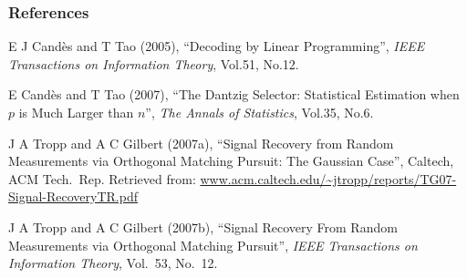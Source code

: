 \documentclass{beamer}
\newcounter{countRef}
\newcommand{\I}{\item}
\begin{document}
\begin{frame}
\frametitle{References}
\begin{enumerate}
\setcounter{enumi}{\value{countRef}} { \small
\I E J Cand\`es and T Tao (2005), ``Decoding by Linear Programming'', \textit{IEEE Transactions on Information Theory}, Vol.51, No.12.
\I E Cand\`es and T Tao (2007), ``The Dantzig Selector: Statistical Estimation when \(p\) is Much Larger than \(n\)'', \textit{The Annals of Statistics}, Vol.35, No.6.
\I J A Tropp and A C Gilbert (2007a), ``Signal Recovery from Random Measurements via Orthogonal Matching Pursuit: The Gaussian Case'', Caltech, ACM Tech.\ Rep. Retrieved from: \url{www.acm.caltech.edu/~jtropp/reports/TG07-Signal-RecoveryTR.pdf}
\I J A Tropp and A C Gilbert (2007b), ``Signal Recovery From Random Measurements via Orthogonal Matching Pursuit'', \textit{IEEE Transactions on Information Theory}, Vol.\ 53, No.\ 12.
}
\end{enumerate}
\end{frame}


\end{document}
